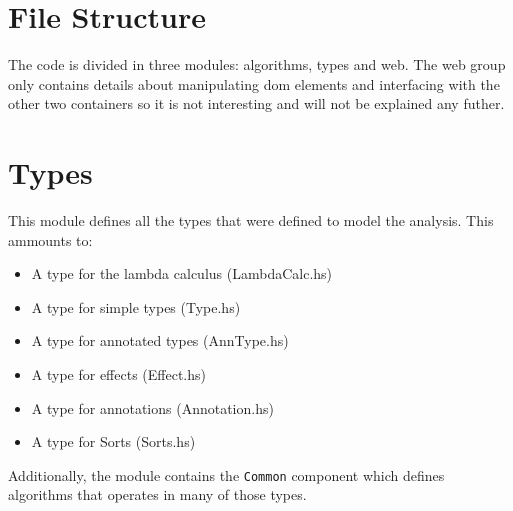 \documentclass[8pt]{extarticle}
\begin{document}
\section{File Structure}
The code is divided in three modules: algorithms, types and web. The web group only contains details about manipulating dom elements and interfacing with the other two containers so it is not interesting and will not be explained any futher.
\section{Types}
This module defines all the types that were defined to model the analysis. This ammounts to:
\begin{itemize}
\item A type for the lambda calculus (LambdaCalc.hs)
\item A type for simple types (Type.hs)
\item A type for annotated types (AnnType.hs)
\item A type for effects (Effect.hs)
\item A type for annotations (Annotation.hs)
\item A type for Sorts (Sorts.hs)
\end{itemize}
Additionally, the module contains the \verb+Common+ component which defines algorithms that operates in many of those types.
\end{document}
